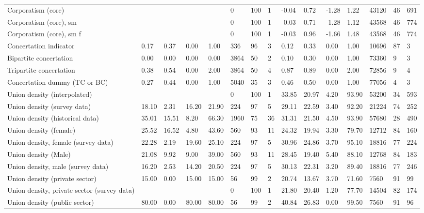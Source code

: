 \begin{longtable}{lllllllllllllll}
Corporatism (core) &  &  &  &  & 0 & 100 & 1 & -0.04 & 0.72 & -1.28 & 1.22 & 43120 & 46 & 691\\
\addlinespace
Corporatism (core), sm &  &  &  &  & 0 & 100 & 1 & -0.03 & 0.71 & -1.28 & 1.12 & 43568 & 46 & 774\\
Corporatism (core), sm f &  &  &  &  & 0 & 100 & 1 & -0.03 & 0.96 & -1.66 & 1.48 & 43568 & 46 & 774\\
Concertation indicator & 0.17 & 0.37 & 0.00 & 1.00 & 336 & 96 & 3 & 0.12 & 0.33 & 0.00 & 1.00 & 10696 & 87 & 3\\
Bipartite concertation & 0.00 & 0.00 & 0.00 & 0.00 & 3864 & 50 & 2 & 0.10 & 0.30 & 0.00 & 1.00 & 73360 & 9 & 3\\
Tripartite concertation & 0.38 & 0.54 & 0.00 & 2.00 & 3864 & 50 & 4 & 0.87 & 0.89 & 0.00 & 2.00 & 72856 & 9 & 4\\
\addlinespace
Concertation dummy (TC or BC) & 0.27 & 0.44 & 0.00 & 1.00 & 5040 & 35 & 3 & 0.46 & 0.50 & 0.00 & 1.00 & 77056 & 4 & 3\\
Union density (interpolated) &  &  &  &  & 0 & 100 & 1 & 33.85 & 20.97 & 4.20 & 93.90 & 53200 & 34 & 593\\
Union density (survey data) & 18.10 & 2.31 & 16.20 & 21.90 & 224 & 97 & 5 & 29.11 & 22.59 & 3.40 & 92.20 & 21224 & 74 & 252\\
Union density (historical data) & 35.01 & 15.51 & 8.20 & 66.30 & 1960 & 75 & 36 & 31.31 & 21.50 & 4.50 & 93.90 & 57680 & 28 & 490\\
Union density (female) & 25.52 & 16.52 & 4.80 & 43.60 & 560 & 93 & 11 & 24.32 & 19.94 & 3.30 & 79.70 & 12712 & 84 & 160\\
\addlinespace
Union density, female (survey data) & 22.28 & 2.19 & 19.60 & 25.10 & 224 & 97 & 5 & 30.96 & 24.86 & 3.70 & 95.10 & 18816 & 77 & 224\\
Union density (Male) & 21.08 & 9.92 & 9.00 & 39.00 & 560 & 93 & 11 & 28.45 & 19.40 & 5.40 & 88.10 & 12768 & 84 & 183\\
Union density, male (survey data) & 16.20 & 2.53 & 14.20 & 20.50 & 224 & 97 & 5 & 30.13 & 22.31 & 3.20 & 89.40 & 18816 & 77 & 246\\
Union density (private sector) & 15.00 & 0.00 & 15.00 & 15.00 & 56 & 99 & 2 & 20.74 & 13.67 & 3.70 & 71.60 & 7560 & 91 & 99\\
Union density, private sector (survey data) &  &  &  &  & 0 & 100 & 1 & 21.80 & 20.40 & 1.20 & 77.70 & 14504 & 82 & 174\\
\addlinespace
Union density (public sector) & 80.00 & 0.00 & 80.00 & 80.00 & 56 & 99 & 2 & 40.84 & 26.83 & 0.00 & 99.50 & 7560 & 91 & 96\\

\end{longtable}

